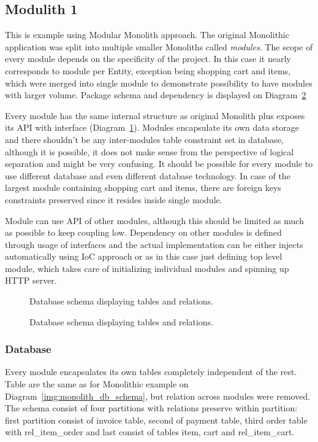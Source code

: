 \subsection{Modulith 1}
This is example using Modular Monolith approach. The original Monolithic application was split into multiple smaller Monoliths called \textit{modules}. The scope of every module depends on the specificity of the project. In this case it nearly corresponds to module per Entity, exception being shopping cart and items, which were merged into single module to demonstrate possibility to have modules with larger volume. Package schema and dependency is displayed on Diagram~\ref{img:modulith_package}

Every module has the same internal structure as original Monolith plus exposes its API with interface (Diagram~\ref{img:modulith_module_package}). Modules encapsulate its own data storage and there shouldn't be any inter-modules table constraint set in database, although it is possible, it does not make sense from the perspective of logical separation and might be very confusing. It should be possible for every module to use different database and even different database technology. In case of the largest module containing shopping cart and items, there are foreign keys constraints preserved since it resides inside single module.

Module can use API of other modules, although this should be limited as much as possible to keep coupling low. Dependency on other modules is defined through usage of interfaces and the actual implementation can be either injects automatically using IoC approach or as in this case just defining top level module, which takes care of initializing individual modules and spinning up HTTP server.

\begin{figure}
    \centering
    
    \caption{Database schema displaying tables and relations. \label{img:modulith_module_package}}
\end{figure}

\begin{figure}
    \centering
    
    \caption{Database schema displaying tables and relations. \label{img:modulith_package}}
\end{figure}

\subsubsection{Database}
Every module encapsulates its own tables completely independent of the rest. Table are the same as for Monolithic example on Diagram~\ref{img:monolith_db_schema}, but relation across modules were removed. The schema consist of four partitions with relations preserve within partition: first partition consist of invoice table, second of payment table, third order table with rel\_item\_order and last consist of tables item, cart and rel\_item\_cart.

